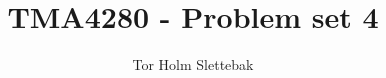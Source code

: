 \titlepage
\title{TMA4280 - Problem set 4}
\author{Tor Holm Slettebak}
\date{\currenttime}
\maketitle

